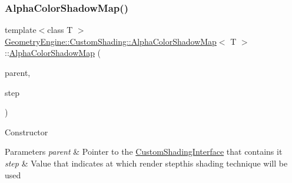 \subsubsection{\texorpdfstring{AlphaColorShadowMap()}{AlphaColorShadowMap()}\hspace{0.1cm}{\footnotesize\ttfamily [1/2]}}
{\footnotesize\ttfamily template$<$class T $>$ \\
\mbox{\hyperlink{class_geometry_engine_1_1_custom_shading_1_1_alpha_color_shadow_map}{Geometry\+Engine\+::\+Custom\+Shading\+::\+Alpha\+Color\+Shadow\+Map}}$<$ T $>$\+::\mbox{\hyperlink{class_geometry_engine_1_1_custom_shading_1_1_alpha_color_shadow_map}{Alpha\+Color\+Shadow\+Map}} (\begin{DoxyParamCaption}\item[{\mbox{\hyperlink{class_geometry_engine_1_1_custom_shading_1_1_custom_shading_interface}{Custom\+Shading\+Interface}} $\ast$}]{parent,  }\item[{\mbox{\hyperlink{namespace_geometry_engine_1_1_custom_shading_a2dc236a5b567da5099069ce2b2be5609}{Custom\+Shading\+Steps}}}]{step }\end{DoxyParamCaption})\hspace{0.3cm}{\ttfamily [inline]}}

Constructor 
\begin{DoxyParams}{Parameters}
{\em parent} & Pointer to the \mbox{\hyperlink{class_geometry_engine_1_1_custom_shading_1_1_custom_shading_interface}{Custom\+Shading\+Interface}} that contains it \\
\hline
{\em step} & Value that indicates at which render stepthis shading technique will be used \\
\hline
\end{DoxyParams}
\mbox{\label{class_geometry_engine_1_1_custom_shading_1_1_alpha_color_shadow_map_af642d840c7cb815b5f33aca8b25a82c1}} 
